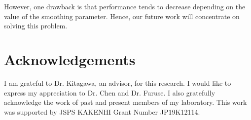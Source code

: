 \documentclass[a4paper,11pt]{report}
\theoremstyle{mytheoremstyle}
\begin{document}
However, one drawback is that performance tends to decrease depending on the value of the smoothing parameter. Hence, our future work will concentrate on solving this problem.


\chapter*{Acknowledgements}
I am grateful to Dr. Kitagawa, an advisor, for this research. I would like to express my appreciation to Dr. Chen and Dr. Furuse. I also gratefully acknowledge the work of past and present members of my laboratory.
This work was supported by JSPS KAKENHI Grant Number JP19K12114.

\nocite{ANNH-FICC} %


\end{document}
